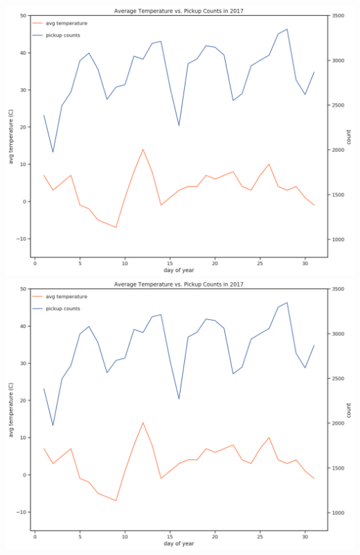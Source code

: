 \documentclass[journal]{IEEEtran}
\begin{document}
\begingroup
    \centering
    \includegraphics[width=\columnwidth]{report/images/2017_temp_count.png}
    \label{fig:2017_temp_count}
    \medskip
\endgroup
\begingroup
    \centering
    \includegraphics[width=\columnwidth]{report/images/2017_temp_count.png}
    \label{fig:2018_temp_count}
    \medskip
\endgroup
\end{document}
